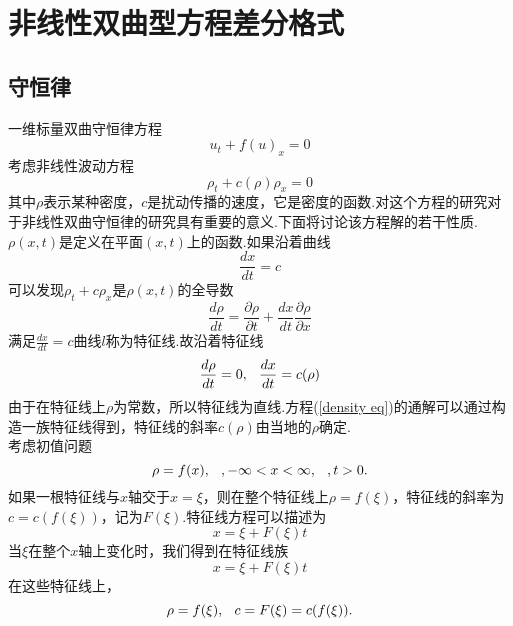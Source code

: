 \chapter{非线性双曲型方程差分格式}
\section{守恒律}
一维标量双曲守恒律方程
	\begin{equation}
		u_t + f(u)_x = 0
	\end{equation}
	考虑非线性波动方程
	\begin{equation} \label{density eq}
		\rho_t + c(\rho)\rho_x = 0
	\end{equation}
	其中$\rho$表示某种密度，$c$是扰动传播的速度，它是密度的函数.对这个方程的研究对于非线性双曲守恒律的研究具有重要的意义.下面将讨论该方程解的若干性质.\\
	$\rho(x,t)$是定义在平面$(x,t)$上的函数.如果沿着曲线
	\begin{equation}
		\frac{dx}{dt} = c
	\end{equation}
	可以发现$\rho_t + c\rho_x$是$\rho(x,t)$的全导数
	\begin{equation}
		\frac{d\rho}{dt}=\frac{\partial \rho}{\partial t} + \frac{dx}{dt}\frac{\partial \rho}{\partial x}
	\end{equation}
	满足$\frac{dx}{dt} = c$曲线$l$称为特征线.故沿着特征线
	\begin{equation}
		\frac{d\rho}{dt}=0,\hspace{0.1in} \frac{dx}{dt} = c(\rho)
	\end{equation}
	由于在特征线上$\rho$为常数，所以特征线为直线.方程(\ref{density eq})的通解可以通过构造一族特征线得到，特征线的斜率$c(\rho)$由当地的$\rho$确定.\\
	考虑初值问题
	\begin{equation}
		\rho=f(x),\hspace{0.1in},-\infty < x < \infty, \hspace{0.1in}, t>0.
	\end{equation}
	如果一根特征线与$x$轴交于$x=\xi$，则在整个特征线上$\rho=f(\xi)$，特征线的斜率为$c=c(f(\xi))$，记为$F(\xi)$.特征线方程可以描述为
	\begin{equation*}
		x = \xi + F(\xi)t
	\end{equation*}
	当$\xi$在整个$x$轴上变化时，我们得到在特征线族
	\begin{equation} \label{cha line}
		x = \xi + F(\xi) t
	\end{equation}
	在这些特征线上，
	\begin{equation} \label{sol}
		\rho = f(\xi),\hspace{0.1in} c=F(\xi)=c(f(\xi)).
	\end{equation}
